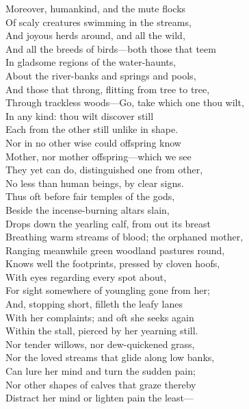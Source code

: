 Moreover, humankind, and the mute flocks\\
Of scaly creatures swimming in the streams,\\
And joyous herds around, and all the wild,\\
And all the breeds of birds—both those that teem\\
In gladsome regions of the water-haunts,\\
About the river-banks and springs and pools,\\
And those that throng, flitting from tree to tree,\\
Through trackless woods—Go, take which one thou wilt,\\
In any kind: thou wilt discover still\\
Each from the other still unlike in shape.\\
Nor in no other wise could offspring know\\
Mother, nor mother offspring—which we see\\
They yet can do, distinguished one from other,\\
No less than human beings, by clear signs.\\
Thus oft before fair temples of the gods,\\
Beside the incense-burning altars slain,\\
Drops down the yearling calf, from out its breast\\
Breathing warm streams of blood; the orphaned mother,\\
Ranging meanwhile green woodland pastures round,\\
Knows well the footprints, pressed by cloven hoofs,\\
With eyes regarding every spot about,\\
For sight somewhere of youngling gone from her;\\
And, stopping short, filleth the leafy lanes\\
With her complaints; and oft she seeks again\\
Within the stall, pierced by her yearning still.\\
Nor tender willows, nor dew-quickened grass,\\
Nor the loved streams that glide along low banks,\\
Can lure her mind and turn the sudden pain;\\
Nor other shapes of calves that graze thereby\\
Distract her mind or lighten pain the least—\\
